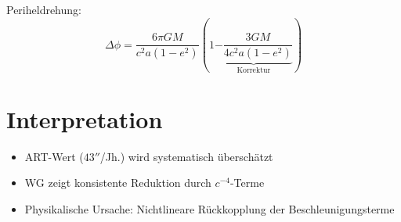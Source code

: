 Periheldrehung:
\begin{equation}
\Delta\phi = \frac{6\pi GM}{c^2a(1-e^2)}\left(1 \underbrace{- \frac{3GM}{4c^2a(1-e^2)}}_{\text{Korrektur}}\right)
\end{equation}

\section{Interpretation}
\begin{itemize}
\item ART-Wert ($43''$/Jh.) wird systematisch überschätzt
\item WG zeigt konsistente Reduktion durch $c^{-4}$-Terme
\item Physikalische Ursache: Nichtlineare Rückkopplung der Beschleunigungsterme
\end{itemize}
